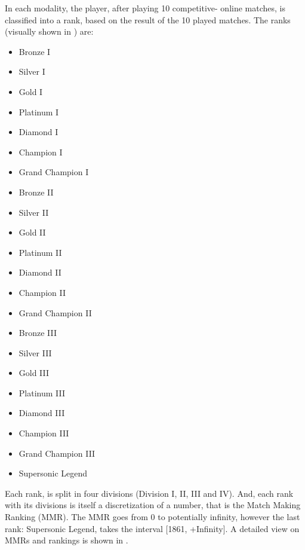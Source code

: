 In each modality, the player, after playing 10 competitive- online matches, is classified into a rank, based on the result of the 10 played matches. The ranks (visually shown in ) are: 


\begin{multicols}{3}
    \begin{itemize}
        \item Bronze I
        \item Silver I
        \item Gold I
        \item Platinum I      
        \item Diamond I        
        \item Champion I         
        \item Grand Champion I    
        \item Bronze II
        \item Silver II
        \item Gold II       
        \item Platinum II     
        \item Diamond  II         
        \item Champion II         
        \item Grand Champion II
        \item Bronze III
        \item Silver III
        \item Gold III    
        \item Platinum III     
        \item Diamond  III        
        \item Champion III         
        \item Grand Champion III
    \end{itemize}
\end{multicols}

\begin{itemize}
    \item Supersonic Legend
\end{itemize}

Each rank, is split in four divisions (Division I, II, III and IV). And, each rank with its divisions is itself a discretization of a number, that is the Match Making Ranking (MMR). 
The MMR goes from 0 to potentially infinity, however the last rank: Supersonic Legend, takes the interval [1861, +Infinity]. A detailed view on MMRs and rankings is shown in .

